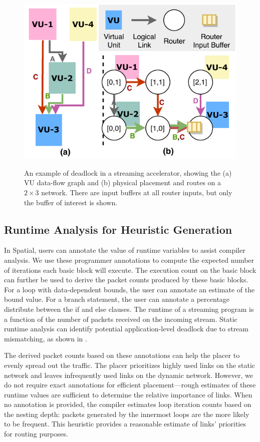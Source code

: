 \begin{figure}
\centering
\includegraphics[width=0.4\columnwidth]{figs/deadlock.pdf}
  \caption{An example of deadlock in a streaming accelerator, showing the (a) VU data-flow graph and (b) physical placement and routes on a $2\times3$ network. There are input buffers at all router inputs, but only the buffer of interest is shown.}\small\textsuperscript{}\label{fig:deadlock}
\end{figure}

\subsection{Runtime Analysis for Heuristic Generation} \label{sec:heuristic}

In Spatial, users can annotate the value of runtime variables to assist compiler analysis.  
We use these programmer annotations to compute the expected number of iterations each basic block
will execute. 
The execution count on the basic block can further be used to derive the packet counts produced
by these basic blocks.
For a loop with data-dependent bounds, the user can annotate an estimate of the bound value.
For a branch statement, the user can annotate a percentage distribute between the if and else clauses.
The runtime of a streaming program is a function of the number of packets received on the incoming
stream. 
Static runtime analysis can identify potential application-level deadlock due to stream mismatching, as shown
in .

The derived packet counts based on these annotations can help the placer to evenly spread out the traffic.
The placer prioritizes highly used links on the static network and leaves infrequently used links on the dynamic network. 
However, we do not require exact annotations for efficient placement---rough estimates of these runtime values are sufficient to determine the relative importance of links.
When no annotation is provided, the compiler estimates
loop iteration counts based on the nesting depth: packets generated by the innermost loops are 
the more likely to be frequent.
This heuristic provides a reasonable estimate of links' priorities for routing purposes.

